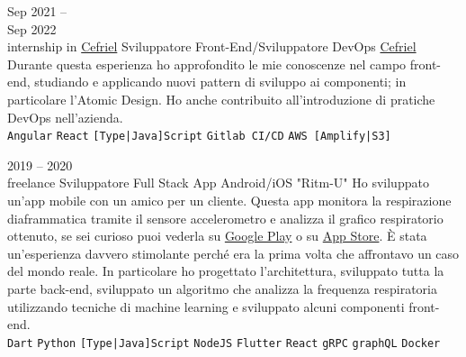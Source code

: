 \documentclass[9pt]{developercv} %
\begin{document}
\begin{entrylist}
	\entry
	{Sep 2021 -- \\Sep 2022\\\footnotesize{internship in \href{https://www.cefriel.com/}{Cefriel}}}
	{Sviluppatore Front-End/Sviluppatore DevOps}
	{\href{https://www.cefriel.com/}{Cefriel}}
	{
		Durante questa esperienza ho approfondito le mie conoscenze nel campo front-end, studiando e applicando nuovi pattern di sviluppo ai componenti; in particolare l'Atomic Design.
		\newline Ho anche contribuito all'introduzione di pratiche DevOps nell'azienda.
		\\
		\texttt{Angular}\slashsep
		\texttt{React}\slashsep
		\texttt{[Type|Java]Script}\slashsep
		\texttt{Gitlab CI/CD}\slashsep
		\texttt{AWS [Amplify|S3]}
	}
\end{entrylist}

\begin{entrylist}
	\entry
	{2019 -- 2020\\\footnotesize{freelance}}
	{Sviluppatore Full Stack}
	{App Android/iOS "Ritm-U"}
	{
		Ho sviluppato un'app mobile con un amico per un cliente. Questa app
		monitora la respirazione diaframmatica tramite il sensore accelerometro
		e analizza il grafico respiratorio ottenuto, se sei curioso puoi vederla su
		\href{https://play.google.com/store/apps/details?id=com.ritmu.app}{Google Play}
		o su \href{https://apps.apple.com/us/app/id1514766559}{App Store}. È stata un'esperienza davvero stimolante
		perché era la prima volta che affrontavo un caso del mondo reale. In particolare
		ho progettato l'architettura, sviluppato tutta la parte back-end,
		sviluppato un algoritmo che analizza la frequenza respiratoria utilizzando tecniche di machine learning e sviluppato alcuni componenti front-end.
		\\
		\texttt{Dart}\slashsep
		\texttt{Python}\slashsep
		\texttt{[Type|Java]Script}\slashsep
		\texttt{NodeJS}\slashsep
		\texttt{Flutter}\slashsep
		\texttt{React}\slashsep
		\texttt{gRPC}\slashsep
		\texttt{graphQL}\slashsep
		\texttt{Docker}
	}
\end{entrylist}



\end{document}
